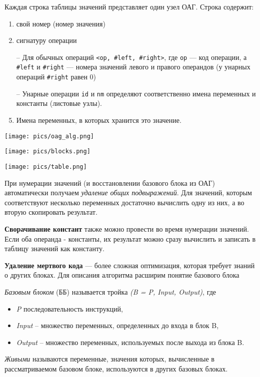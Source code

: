 Каждая строка таблицы значений представляет один узел ОАГ. Строка содержит:
\begin{enumerate}
    \item свой номер (номер значения)
    \item сигнатуру операции
        \item[--] Для обычных операций \texttt{<op, \#left, \#right>}, где \texttt{ор} –-- код операции, а \texttt{\#left} и \texttt{\#right} --- номера значений левого и правого операндов (у унарных операций \texttt{\#right} равен 0)
        \item[--] Унарные операции \texttt{id} и \texttt{nm} определяют соответственно имена переменных и константы (листовые узлы).
    \item Имена переменных, в которых хранится это значение.
\end{enumerate}

\texttt{[image: pics/oag\_alg.png]}

\texttt{[image: pics/blocks.png]}

\texttt{[image: pics/table.png]}

При нумерации значений (и восстановлении базового блока из ОАГ) автоматически получаем \textit{удаление общих подвыражений}. Для значений, которым соответствуют несколько переменных достаточно вычислить одну из них, а во вторую скопировать результат.

\textbf{Сворачивание констант} также можно провести во время нумерации значений. Если оба операнда - константы, их результат можно сразу вычислить и записать в таблицу значений как константу.

\textbf{Удаление мертвого кода} --- более сложная оптимизация, которая требует знаний о других блоках. Для описания алгоритма расширим понятие базового блока

\textit{Базовым блоком} (ББ) называется тройка \textit{(B = P, Input, Output)}, где
\begin{itemize}
    \item \textit{P} последовательность инструкций,
    \item \textit{Input} – множество переменных, определенных до входа в блок B,
    \item \textit{Output} – множество переменных, используемых после выхода из блока B.
\end{itemize}

\textit{Живыми} называются переменные, значения которых, вычисленные в рассматриваемом базовом блоке, используются в других базовых блоках.

